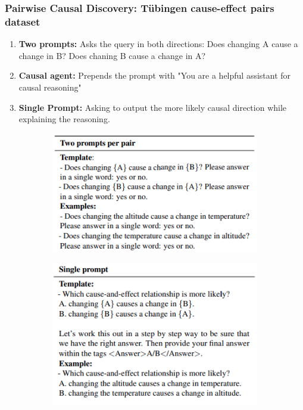 \documentclass{beamer}
\begin{document}
\begin{frame}
	\frametitle{Pairwise Causal Discovery: T\"{u}bingen cause-effect pairs dataset}
	\begin{enumerate}
		\item \textbf{Two prompts: } Asks the query in both directions: Does changing A cause a change in B? Does chaning B cause a change in A?
		\item \textbf{Causal agent: } Prepends the prompt with "You are a helpful assistant for causal reasoning"
		\item \textbf{Single Prompt: } Asking to output the more likely causal
			direction while explaining the reasoning.
	\end{enumerate}
	\begin{figure}
		\centering
		\begin{subfigure}{0.5 \textwidth}
			\centering
			\includegraphics[scale=0.4]{imgs/example1.png}
		\end{subfigure}%
		\begin{subfigure}{0.5 \textwidth}
			\centering
			\includegraphics[scale=0.4]{imgs/example2.png}
		\end{subfigure}
	\end{figure}
\end{frame}
\end{document}

